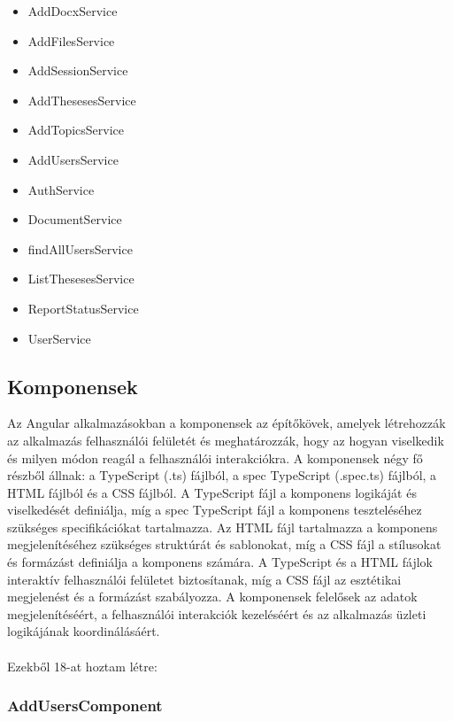 \begin{itemize}

\item{AddDocxService}
\item{AddFilesService}
\item{AddSessionService}
\item{AddThesesesService}
\item{AddTopicsService}
\item{AddUsersService}
\item{AuthService}
\item{DocumentService}
\item{findAllUsersService}
\item{ListThesesesService}
\item{ReportStatusService}
\item{UserService}

\end{itemize}


\subsection{Komponensek}

Az Angular alkalmazásokban a komponensek az építőkövek, amelyek létrehozzák az alkalmazás felhasználói felületét és meghatározzák, hogy az hogyan viselkedik és milyen módon reagál a felhasználói interakciókra. A komponensek négy fő részből állnak: a TypeScript (.ts) fájlból, a spec TypeScript (.spec.ts) fájlból, a HTML fájlból és a CSS fájlból. A TypeScript fájl a komponens logikáját és viselkedését definiálja, míg a spec TypeScript fájl a komponens teszteléséhez szükséges specifikációkat tartalmazza. Az HTML fájl tartalmazza a komponens megjelenítéséhez szükséges struktúrát és sablonokat, míg a CSS fájl a stílusokat és formázást definiálja a komponens számára. A TypeScript és a HTML fájlok interaktív felhasználói felületet biztosítanak, míg a CSS fájl az esztétikai megjelenést és a formázást szabályozza. A komponensek felelősek az adatok megjelenítéséért, a felhasználói interakciók kezeléséért és az alkalmazás üzleti logikájának koordinálásáért.\\
\\
Ezekből 18-at hoztam létre:

\subsubsection{AddUsersComponent}

